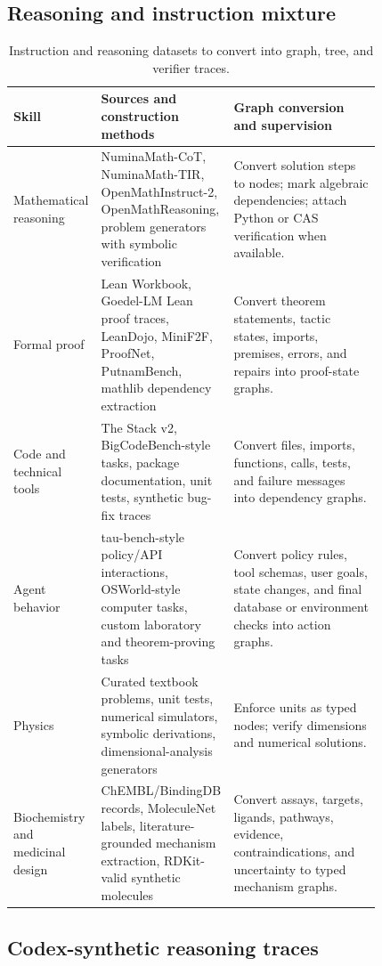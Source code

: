\documentclass[11pt]{article}
\newcommand{\1}{\mathbf{1}}
\begin{document}
\subsection{Reasoning and instruction mixture}

\begin{longtable}{p{0.18\linewidth}p{0.24\linewidth}p{0.40\linewidth}}
\caption{Instruction and reasoning datasets to convert into graph, tree, and verifier traces.}\label{tab:reasoning-sources}\\
\toprule
Skill & Sources and construction methods & Graph conversion and supervision\\
\midrule
Mathematical reasoning & NuminaMath-CoT, NuminaMath-TIR, OpenMathInstruct-2, OpenMathReasoning, problem generators with symbolic verification & Convert solution steps to nodes; mark algebraic dependencies; attach Python or CAS verification when available.\\
Formal proof & Lean Workbook, Goedel-LM Lean proof traces, LeanDojo, MiniF2F, ProofNet, PutnamBench, mathlib dependency extraction & Convert theorem statements, tactic states, imports, premises, errors, and repairs into proof-state graphs.\\
Code and technical tools & The Stack v2, BigCodeBench-style tasks, package documentation, unit tests, synthetic bug-fix traces & Convert files, imports, functions, calls, tests, and failure messages into dependency graphs.\\
Agent behavior & tau-bench-style policy/API interactions, OSWorld-style computer tasks, custom laboratory and theorem-proving tasks & Convert policy rules, tool schemas, user goals, state changes, and final database or environment checks into action graphs.\\
Physics & Curated textbook problems, unit tests, numerical simulators, symbolic derivations, dimensional-analysis generators & Enforce units as typed nodes; verify dimensions and numerical solutions.\\
Biochemistry and medicinal design & ChEMBL/BindingDB records, MoleculeNet labels, literature-grounded mechanism extraction, RDKit-valid synthetic molecules & Convert assays, targets, ligands, pathways, evidence, contraindications, and uncertainty to typed mechanism graphs.\\
\bottomrule
\end{longtable}

\subsection{Codex-synthetic reasoning traces}
\end{document}
